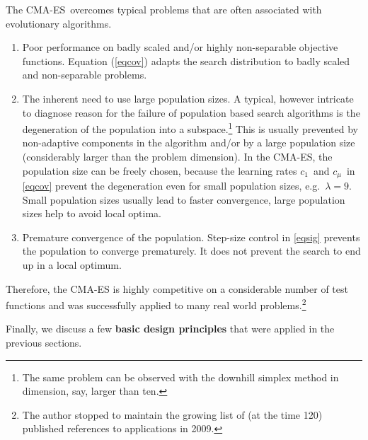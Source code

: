 \documentclass{article} %
\newcommand{\kom}[1]{}
\newcommand{\auge}[1]{\textbf{#1}}
\newcommand{\cma}{CMA-ES}
\newcommand{\lam}{\ensuremath{\lambda}}
\newcommand{\sig}{\ensuremath{\sigma}}
\newcommand{\cs}{c_\sig}
\newcommand{\cone}{\ensuremath{c_1}}
\newcommand{\cmu}{\ensuremath{c_\mu}}
\newcommand{\Eqref}[1]{Equation (\ref{#1})}
\begin{document}
The \cma\ overcomes typical problems that are often
associated with evolutionary algorithms. 
\begin{enumerate}
  \item Poor performance on badly scaled and/or highly
    non-separable objective functions. \Eqref{eqcov} adapts
    the search distribution to badly scaled and non-separable
    problems. 
    
  \item The inherent need to use large population sizes. A
    typical, however intricate to diagnose reason for the failure of
    population based search algorithms is the degeneration of the
    population into a subspace.\footnote{%
    The same problem can be observed with the downhill simplex 
    method \cite{nelder1965simplex} in dimension, say, larger than ten. 
    }
     This is usually prevented by
    non-adaptive components in the algorithm and/or by a large
    population size (considerably larger than the problem dimension).
    In the CMA-ES, the population size can be freely chosen, because
    the learning rates \cone\ and \cmu\ in \eqref{eqcov}\kom{ and the step-size
      control}\kom{and the time constant $\frac{1}{\cs}$ in
      \eqref{algps} and \eqref{algsig}} prevent the degeneration even
    for small population sizes, e.g.\ $\lam=9$.  Small population
    sizes usually lead to faster convergence,\kom{ in terms of number
      of function evaluations,} large population sizes help to avoid
    local optima\kom{ and therefore can improve the global search
      behavior}.

  \item Premature convergence of the population. Step-size control in
    \eqref{eqsig} prevents the population to converge prematurely. It
    does not prevent the search to end up in a {local} optimum. 

\end{enumerate}%
%
Therefore, the CMA-ES is highly competitive on a
considerable number of test functions
\cite{Hansen:1998,Hansen:2004b,Hansen:2003,Hansen:1997,Hansen:2001}
and was
  successfully applied to many real world problems.\footnote{%
%
    The author stopped to maintain the growing list of (at the time 120) published references to applications in 2009.}

  Finally, we discuss a few \auge{basic design principles} that were applied
  in the previous sections. 
  
\end{document}
